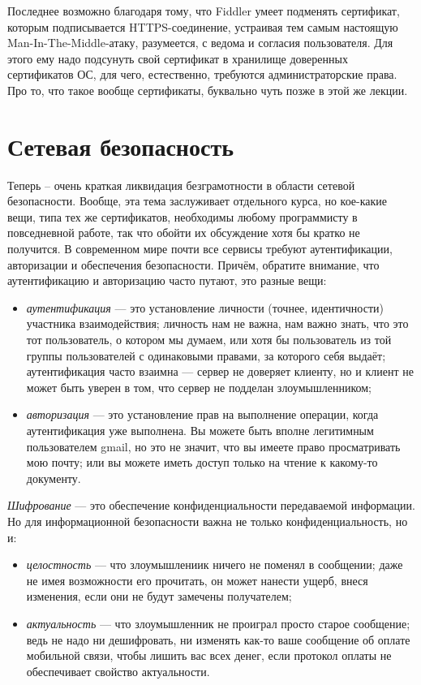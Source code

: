 \documentclass{../../text-style}
\begin{document}
Последнее возможно благодаря тому, что Fiddler умеет подменять сертификат, которым подписывается HTTPS-соединение, устраивая тем самым настоящую Man-In-The-Middle-атаку, разумеется, с ведома и согласия пользователя. Для этого ему надо подсунуть свой сертификат в хранилище доверенных сертификатов ОС, для чего, естественно, требуются администраторские права. Про то, что такое вообще сертификаты, буквально чуть позже в этой же лекции.

\section{Сетевая безопасность}

Теперь -- очень краткая ликвидация безграмотности в области сетевой безопасности. Вообще, эта тема заслуживает отдельного курса, но кое-какие вещи, типа тех же сертификатов, необходимы любому программисту в повседневной работе, так что обойти их обсуждение хотя бы кратко не получится. В современном мире почти все сервисы требуют аутентификации, авторизации и обеспечения безопасности. Причём, обратите внимание, что аутентификацию и авторизацию часто путают, это разные вещи:

\begin{itemize}
    \item \textit{аутентификация} --- это установление личности (точнее, идентичности) участника взаимодействия; личность нам не важна, нам важно знать, что это тот пользователь, о котором мы думаем, или хотя бы пользователь из той группы пользователей с одинаковыми правами, за которого себя выдаёт; аутентификация часто взаимна --- сервер не доверяет клиенту, но и клиент не может быть уверен в том, что сервер не подделан злоумышленником;
    \item \textit{авторизация} --- это установление прав на выполнение операции, когда аутентификация уже выполнена. Вы можете быть вполне легитимным пользователем gmail, но это не значит, что вы имеете право просматривать мою почту; или вы можете иметь доступ только на чтение к какому-то документу.
\end{itemize}

\textit{Шифрование} --- это обеспечение конфиденциальности передаваемой информации. Но для информационной безопасности важна не только конфиденциальность, но и:

\begin{itemize}
    \item \textit{целостность} --- что злоумышлениик ничего не поменял в сообщении; даже не имея возможности его прочитать, он может нанести ущерб, внеся изменения, если они не будут замечены получателем;
    \item \textit{актуальность} --- что злоумышленник не проиграл просто старое сообщение; ведь не надо ни дешифровать, ни изменять как-то ваше сообщение об оплате мобильной связи, чтобы лишить вас всех денег, если протокол оплаты не обеспечивает свойство актуальности.
\end{itemize} 
\end{document}
